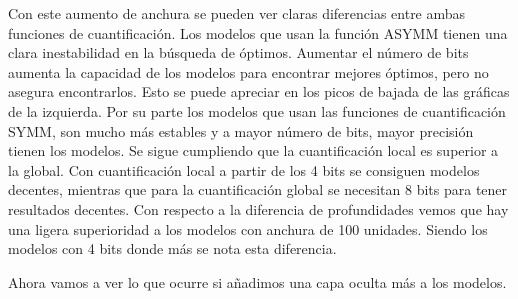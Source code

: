 Con este aumento de anchura se pueden ver claras diferencias entre ambas funciones de cuantificación. Los modelos que usan la función ASYMM tienen una clara inestabilidad en la búsqueda de óptimos. Aumentar el número de bits aumenta la capacidad de los modelos para encontrar mejores óptimos, pero no asegura encontrarlos. Esto se puede apreciar en los picos de bajada de las gráficas de la izquierda. Por su parte los modelos que usan las funciones de cuantificación SYMM, son mucho más estables y a mayor número de bits, mayor precisión tienen los modelos. Se sigue cumpliendo que la cuantificación local es superior a la global. Con cuantificación local a partir de los 4 bits se consiguen modelos decentes, mientras que para la cuantificación global se necesitan 8 bits para tener resultados decentes. Con respecto a la diferencia de profundidades vemos que hay una ligera superioridad a los modelos con anchura de 100 unidades. Siendo los modelos con 4 bits donde más se nota esta diferencia.

Ahora vamos a ver lo que ocurre si añadimos una capa oculta más a los modelos.

